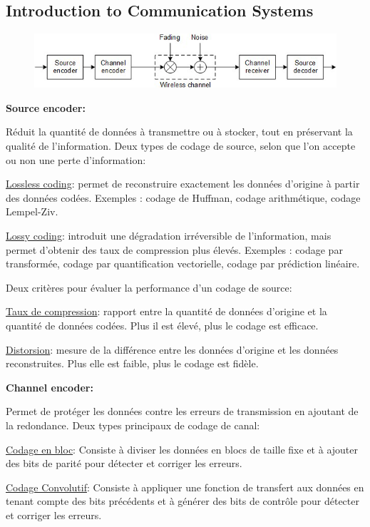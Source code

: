 \subsection*{Introduction to Communication Systems}

\setlength{\intextsep}{0pt}
\begin{figure}[H]
    \includegraphics[width=\linewidth]{images/wireless_channel_model.png}
\end{figure}
\textbf{Source encoder:}

Réduit la quantité de données à transmettre ou à stocker, tout en préservant la qualité de
l'information.
Deux types de codage de source, selon que l'on accepte ou non une
perte d'information:

\underline{Lossless coding}: permet de reconstruire exactement les données d'origine à
partir des données codées. Exemples : codage de Huffman, codage arithmétique, codage Lempel-Ziv.

\underline{Lossy coding}: introduit une dégradation irréversible de l'information, mais permet
d'obtenir des taux de compression plus élevés. Exemples : codage par transformée,
codage par quantification vectorielle, codage par prédiction linéaire.

Deux critères pour évaluer la performance d'un codage de source:

\underline{Taux de compression}: rapport entre la quantité de données d'origine et la
quantité de données codées. Plus il est élevé, plus le codage est efficace.

\underline{Distorsion}: mesure de la différence entre les données d'origine et les données
reconstruites. Plus elle est faible, plus le codage est fidèle.

\textbf{Channel encoder:}

Permet de protéger les données contre les erreurs de transmission en ajoutant de la redondance.
Deux types principaux de codage de canal:

\underline{Codage en bloc}: Consiste à diviser les données en blocs de taille fixe et à ajouter
des bits de parité pour détecter et corriger les erreurs.

\underline{Codage Convolutif}: Consiste à appliquer une fonction de transfert aux données en
tenant compte des bits précédents et à générer des bits de contrôle pour détecter et
corriger les erreurs.

